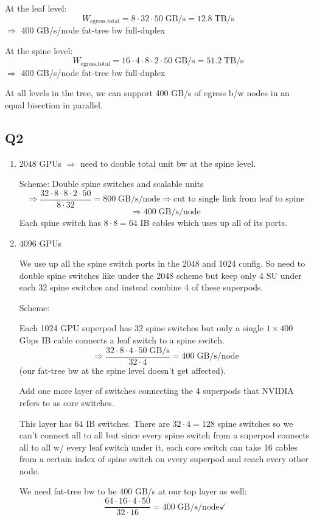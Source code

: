 \documentclass[11pt]{article}
\begin{document}
At the leaf level:
\[
W_{\text{egress,total}} = 8 \cdot 32 \cdot 50 \;\text{GB/s} = 12.8 \;\text{TB/s}
\]
$\Rightarrow$ 400 GB/s/node fat-tree bw full-duplex

At the spine level:
\[
W_{\text{egress,total}} = 16 \cdot 4 \cdot 8 \cdot 2 \cdot 50 \;\text{GB/s} = 51.2 \;\text{TB/s}
\]
$\Rightarrow$ 400 GB/s/node fat-tree bw full-duplex

At all levels in the tree, we can support 400 GB/s of egress b/w nodes in an equal bisection in parallel.

\subsection*{Q2}

\begin{enumerate}[label=(\roman*)]
    \item 2048 GPUs $\Rightarrow$ need to double total unit bw at the spine level.

    Scheme: Double spine switches and scalable units
    \[
    \Rightarrow \frac{32 \cdot 8 \cdot 8 \cdot 2 \cdot 50}{8 \cdot 32} = 800 \;\text{GB/s/node} \Rightarrow \text{cut to single link from leaf to spine}
    \]
    \[
    \Rightarrow 400 \;\text{GB/s/node}
    \]
    Each spine switch has $8 \cdot 8 = 64$ IB cables which uses up all of its ports.

    \item 4096 GPUs

    We use up all the spine switch ports in the 2048 and 1024 config. So need to double spine switches like under the 2048 scheme but keep only 4 SU under each 32 spine switches and instead combine 4 of these superpods.

    Scheme:

    Each 1024 GPU superpod has 32 spine switches but only a single $1 \times 400$ Gbps IB cable connects a leaf switch to a spine switch.
    \[
    \Rightarrow \frac{32 \cdot 8 \cdot 4 \cdot 50 \;\text{GB/s}}{32 \cdot 4} = 400 \;\text{GB/s/node}
    \]
    (our fat-tree bw at the spine level doesn't get affected).

    Add one more layer of switches connecting the 4 superpods that NVIDIA refers to as core switches.

    This layer has 64 IB switches. There are $32 \cdot 4 = 128$ spine switches so we can't connect all to all but since every spine switch from a superpod connects all to all w/ every leaf switch under it, each core switch can take 16 cables from a certain index of spine switch on every superpod and reach every other node.

    We need fat-tree bw to be 400 GB/s at our top layer as well:
    \[
    \frac{64 \cdot 16 \cdot 4 \cdot 50}{32 \cdot 16} = 400 \;\text{GB/s/node} \checkmark
    \]
\end{enumerate}
\end{document}
